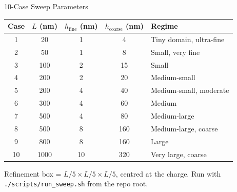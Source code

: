 \documentclass[aspectratio=169]{beamer}
\begin{document}
\begin{frame}{10-Case Sweep Parameters}
  \begin{center}
  \renewcommand{\arraystretch}{1.25}
  \begin{tabular}{ccccl}
    \toprule
    Case & $L$ (nm) & $h_\text{fine}$ (nm) & $h_\text{coarse}$ (nm) & Regime \\
    \midrule
    1  &   20 &  1 &   4 & Tiny domain, ultra-fine \\
    2  &   50 &  1 &   8 & Small, very fine \\
    3  &  100 &  2 &  15 & Small \\
    4  &  200 &  2 &  20 & Medium-small \\
    5  &  200 &  4 &  40 & Medium-small, moderate \\
    6  &  300 &  4 &  60 & Medium \\
    7  &  500 &  4 &  80 & Medium-large \\
    8  &  500 &  8 & 160 & Medium-large, coarse \\
    9  &  800 &  8 & 160 & Large \\
    10 & 1000 & 10 & 320 & Very large, coarse \\
    \bottomrule
  \end{tabular}
  \end{center}

  \vspace{0.3em}
  Refinement box = $L/5 \times L/5 \times L/5$, centred at the charge.
  Run with \texttt{./scripts/run\_sweep.sh} from the repo root.
\end{frame}
\end{document}
